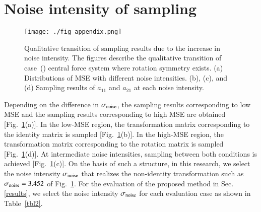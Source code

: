 \documentclass[preprint,
bibnotes,
 amsmath,amssymb,
 aps,
]{revtex4-1}
\newcounter{num}
\newcommand{\rnum}[1]{\setcounter{num}{#1}\roman{num}}
\begin{document}
\section{Noise intensity of sampling}
\label{appendix_sec3}
\begin{figure}
 \begin{center}
  \texttt{[image: ./fig\_appendix.png]}
  \caption{Qualitative transition of sampling results due to the increase in noise intensity. 
The figures describe the qualitative transition of case~(\rnum{3}) central force system where rotation symmetry exists. 
(a) Distributions of MSE with different noise intensities. 
(b), (c), and (d) Sampling results of $a_{11}$ and $a_{21}$ at each noise intensity. }
  \label{fig_appendix1}
 \end{center}
\end{figure}
Depending on the difference in $\sigma_{\rm noise}$, the sampling results corresponding to low MSE and the sampling results corresponding to high MSE are obtained [Fig.~\ref{fig_appendix1}(a)]. 
In the low-MSE region, the transformation matrix corresponding to the identity matrix is sampled [Fig.~\ref{fig_appendix1}(b)]. 
In the high-MSE region, the transformation matrix corresponding to the rotation matrix is sampled [Fig.~\ref{fig_appendix1}(d)]. 
At intermediate noise intensities, sampling between both conditions is achieved [Fig.~\ref{fig_appendix1}(c)]. 
On the basis of such a structure, in this research, we select the noise intensity $\sigma_{\rm noise}$ that realizes the non-identity transformation such as $\sigma_{\rm noise} = 3.452$ of Fig.~\ref{fig_appendix1}. For the evaluation of the proposed method in Sec. \ref{results}, we select the noise intensity $\sigma_{\rm noise}$ for each evaluation case as shown in Table~\ref{tbl2}.\par
\end{document}

